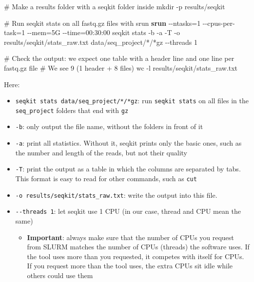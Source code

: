\documentclass[
  letterpaper,
  DIV=11,
  numbers=noendperiod]{scrreprt}
\newenvironment{Shaded}{}{}
\newcommand{\AttributeTok}[1]{\textcolor[rgb]{0.84,0.23,0.29}{#1}}
\newcommand{\CommentTok}[1]{\textcolor[rgb]{0.42,0.45,0.49}{#1}}
\newcommand{\ExtensionTok}[1]{\textcolor[rgb]{0.84,0.23,0.29}{\textbf{#1}}}
\newcommand{\FunctionTok}[1]{\textcolor[rgb]{0.44,0.26,0.76}{#1}}
\newcommand{\NormalTok}[1]{\textcolor[rgb]{0.14,0.16,0.18}{#1}}
\newcommand{\OperatorTok}[1]{\textcolor[rgb]{0.14,0.16,0.18}{#1}}
\newcommand{\PreprocessorTok}[1]{\textcolor[rgb]{0.84,0.23,0.29}{#1}}
\providecommand{\tightlist}{%
  \setlength{\itemsep}{0pt}\setlength{\parskip}{0pt}}
\begin{document}
\begin{Shaded}
\begin{Highlighting}[]
\CommentTok{\# Make a results folder with a seqkit folder inside}
\FunctionTok{mkdir} \AttributeTok{{-}p}\NormalTok{ results/seqkit}

\CommentTok{\# Run seqkit stats on all fastq.gz files with srun}
\ExtensionTok{srun} \AttributeTok{{-}{-}ntasks}\OperatorTok{=}\NormalTok{1 }\AttributeTok{{-}{-}cpus{-}per{-}task}\OperatorTok{=}\NormalTok{1 }\AttributeTok{{-}{-}mem}\OperatorTok{=}\NormalTok{5G }\AttributeTok{{-}{-}time}\OperatorTok{=}\NormalTok{00:30:00 seqkit stats }\AttributeTok{{-}b} \AttributeTok{{-}a} \AttributeTok{{-}T} \AttributeTok{{-}o}\NormalTok{ results/seqkit/stats\_raw.txt data/seq\_project/}\PreprocessorTok{*}\NormalTok{/}\PreprocessorTok{*}\NormalTok{gz }\AttributeTok{{-}{-}threads}\NormalTok{ 1}

\CommentTok{\# Check the output: we expect one table with a header line and one line per fastq.gz file}
\CommentTok{\# We see 9 (1 header + 8 files)}
\FunctionTok{wc} \AttributeTok{{-}l}\NormalTok{ results/seqkit/stats\_raw.txt}
\end{Highlighting}
\end{Shaded}

Here:

\begin{itemize}
\tightlist
\item
  \texttt{seqkit\ stats\ data/seq\_project/*/*gz}: run
  \texttt{seqkit\ stats} on all files in the \texttt{seq\_project}
  folders that end with \texttt{gz}
\item
  \texttt{-b}: only output the file name, without the folders in front
  of it
\item
  \texttt{-a}: print all statistics. Without it, seqkit prints only the
  basic ones, such as the number and length of the reads, but not their
  quality
\item
  \texttt{-T}: print the output as a table in which the columns are
  separated by tabs. This format is easy to read for other commands,
  such as \texttt{cut}
\item
  \texttt{-o\ results/seqkit/stats\_raw.txt}: write the output into this
  file.
\item
  \texttt{-\/-threads\ 1}: let seqkit use 1 CPU (in our case, thread and
  CPU mean the same)

  \begin{itemize}
  \tightlist
  \item
    \textbf{Important}: always make sure that the number of CPUs you
    request from SLURM matches the number of CPUs (threads) the software
    uses. If the tool uses more than you requested, it competes with
    itself for CPUs. If you request more than the tool uses, the extra
    CPUs sit idle while others could use them
  \end{itemize}
\end{itemize}
\end{document}
